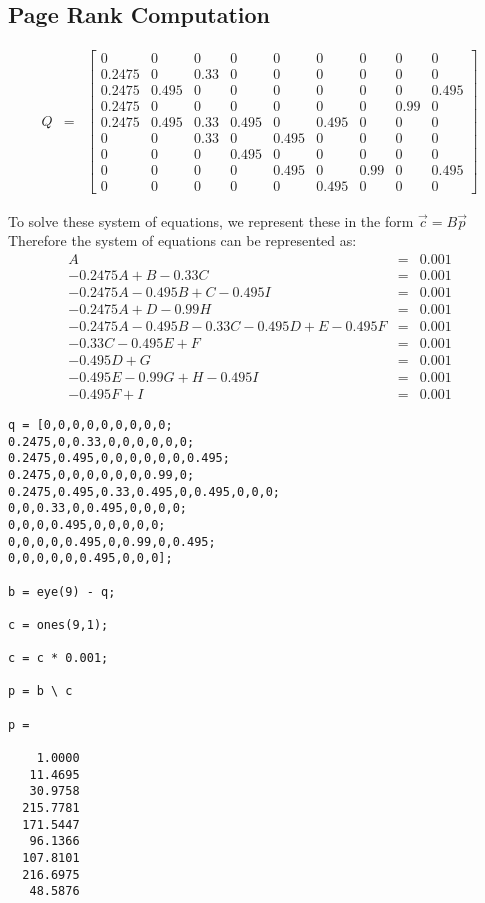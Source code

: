 \documentclass{article}
\begin{document}
\subsection{\textbf{Page Rank Computation}}
\[
\begin{array}{lcl}Q & = &
\begin{bmatrix} 0 & 0 & 0 & 0 & 0 & 0 & 0 & 0 & 0 \\ 0.2475 & 0 & 0.33 & 0 & 0 & 0 & 0 & 0 & 0 \\ 0.2475 & 0.495 & 0 & 0 & 0 & 0 & 0 & 0 & 0.495 \\ 0.2475 & 0 & 0 & 0 & 0& 0 & 0 & 0.99 & 0 \\ 0.2475 & 0.495 & 0.33 & 0.495 & 0 & 0.495 & 0 & 0 & 0 \\ 0 & 0 & 0.33 & 0 & 0.495 & 0 & 0 & 0 & 0 \\ 0 & 0 & 0 & 0.495 & 0 & 0 & 0 & 0 & 0 \\ 0 & 0 & 0 & 0 & 0.495 & 0 & 0.99 & 0 & 0.495 \\ 0 & 0 & 0 & 0 & 0 & 0.495 & 0 & 0 & 0
\end{bmatrix}
\end{array}
\]

To solve these system of equations, we represent these in the form $\vec{c} = B\vec{p}$
Therefore the system of equations can be represented as:
\[
\begin{array}{rcl}A & = & 0.001 \\ -0.2475A + B - 0.33C & = & 0.001 \\ -0.2475A - 0.495B + C - 0.495I & = & 0.001 \\ -0.2475A + D - 0.99H & = & 0.001 \\ -0.2475A - 0.495B - 0.33C -0.495D + E - 0.495F & = &0.001 \\ -0.33C - 0.495E + F & = & 0.001 \\ -0.495D + G & = & 0.001 \\ -0.495E - 0.99G + H - 0.495I & = & 0.001 \\ -0.495F + I & = & 0.001
\end{array}
\]
\begin{lstlisting}
q = [0,0,0,0,0,0,0,0,0;
0.2475,0,0.33,0,0,0,0,0,0;
0.2475,0.495,0,0,0,0,0,0,0.495;
0.2475,0,0,0,0,0,0,0.99,0;
0.2475,0.495,0.33,0.495,0,0.495,0,0,0;
0,0,0.33,0,0.495,0,0,0,0;
0,0,0,0.495,0,0,0,0,0;
0,0,0,0,0.495,0,0.99,0,0.495;
0,0,0,0,0,0.495,0,0,0];

b = eye(9) - q;

c = ones(9,1);

c = c * 0.001;

p = b \ c

p =

    1.0000
   11.4695
   30.9758
  215.7781
  171.5447
   96.1366
  107.8101
  216.6975
   48.5876
\end{lstlisting}
\end{document}
